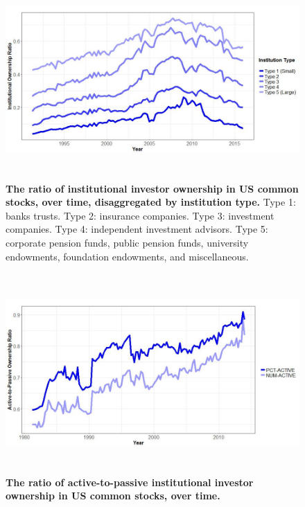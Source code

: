 \documentclass[thesis]{thesis-umich}
\begin{document}
\begin{figure}[H] 
\centering
\includegraphics[width=6in, height=3in]{figures/ior_by_quarter}
\caption[\textbf{The ratio of institutional investor ownership in US common stocks, over time, disaggregated by institution type.}]{\footnotesize \textbf{The ratio of institutional investor ownership in US common stocks, over time, disaggregated by institution type.}
Type 1: banks trusts.
Type 2: insurance companies. 
Type 3: investment companies.
Type 4: independent investment advisors.
Type 5: corporate pension funds, public pension funds, university endowments, foundation endowments, and miscellaneous.} \label{fig:ior}
\end{figure} 
\newpage

\begin{figure}[H] 
\centering
\includegraphics[width=6in, height=3in]{figures/pctactive_by_quarter}
\caption[\textbf{The ratio of active-to-passive institutional investor ownership in US common stocks, over time.}]{\footnotesize \textbf{The ratio of active-to-passive institutional investor ownership in US common stocks, over time.}} \label{fig:pctactive}
\end{figure} 
\newpage
\end{document}
